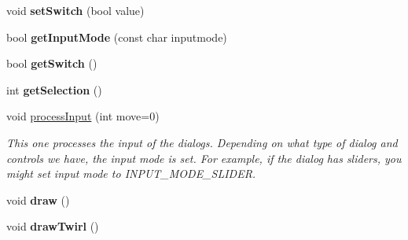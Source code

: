 \begin{DoxyCompactItemize}
\item 
\hypertarget{class_c_dialog_a76f20f826b445af94225052c40e1f1d0}{
void {\bfseries setSwitch} (bool value)}
\label{class_c_dialog_a76f20f826b445af94225052c40e1f1d0}

\item 
\hypertarget{class_c_dialog_aeb933db8dc1d29d30f84d861b79b9ef4}{
bool {\bfseries getInputMode} (const char inputmode)}
\label{class_c_dialog_aeb933db8dc1d29d30f84d861b79b9ef4}

\item 
\hypertarget{class_c_dialog_a6ad3a7930a5f71b162cb2380a67771ae}{
bool {\bfseries getSwitch} ()}
\label{class_c_dialog_a6ad3a7930a5f71b162cb2380a67771ae}

\item 
\hypertarget{class_c_dialog_a8b09e5131ab965d991324d81b3794399}{
int {\bfseries getSelection} ()}
\label{class_c_dialog_a8b09e5131ab965d991324d81b3794399}

\item 
void \hyperlink{class_c_dialog_a62748353c0cbd01c5ef6514bb045d4e6}{processInput} (int move=0)
\begin{DoxyCompactList}\small\item\em This one processes the input of the dialogs. Depending on what type of dialog and controls we have, the input mode is set. For example, if the dialog has sliders, you might set input mode to INPUT\_\-MODE\_\-SLIDER. \item\end{DoxyCompactList}\item 
\hypertarget{class_c_dialog_a815b6f01634482e15eb91d2b09552077}{
void {\bfseries draw} ()}
\label{class_c_dialog_a815b6f01634482e15eb91d2b09552077}

\item 
\hypertarget{class_c_dialog_a048282abf1147e3c6a51e52d31b010e5}{
void {\bfseries drawTwirl} ()}
\label{class_c_dialog_a048282abf1147e3c6a51e52d31b010e5}

\end{DoxyCompactItemize}
